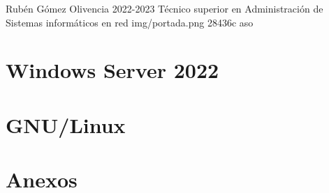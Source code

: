 \documentclass{\ClassPath/yukibook}
\begin{document}
    {Rubén Gómez Olivencia}  %
    {2022-2023}    %
    {Técnico superior en Administración de \linebreak Sistemas informáticos en red} %
    {}%
    {}%
    {img/portada.png} %
    {28436c}
    {aso} %

    \coverpage
    \graphicspath{{../../../yukibook.cls/}}
    \licensepage

    \tableofcontents


    \part{Windows Server 2022}
    \graphicspath{{../../../temas_comunes/windows_server/img/windows_server/}}
    

%    

    \part{GNU/Linux}
    \graphicspath{{../../../temas_comunes/gnu_linux/img/}}
    
    
    
    

    \part{Anexos}

    \graphicspath{{../../../anexos/instalar_ubuntu_lts/img/}}
    

    \graphicspath{{../../../anexos/ubuntu_raid1/img/}}
    

    \graphicspath{{../../../temas_comunes/administracion_remota/img/}}
    

    \graphicspath{{../../../anexos/gestion_backups/img/}}
    

    \graphicspath{{../../../anexos/sistemas_monitorizacion/img/}}
    

    \graphicspath{{../../../anexos/monitorizacion_munin/img/}}
    

    \graphicspath{{../../../anexos/virtualbox_networking/img}}
    

    \graphicspath{{../../../anexos/}}
    
\end{document}
